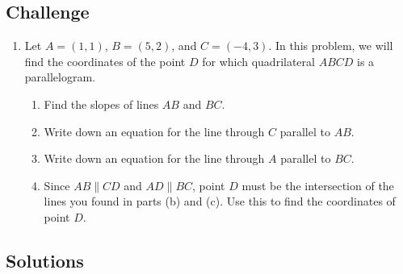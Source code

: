 \subsection{Challenge}

\begin{enumerate}[resume]
\item Let $A = (1,1)$, $B = (5,2)$, and $C = (-4,3)$. In this problem, we will find the coordinates of the point $D$ for which quadrilateral $ABCD$ is a parallelogram.
\begin{enumerate}
\item Find the slopes of lines $AB$ and $BC$.
\item Write down an equation for the line through $C$ parallel to $AB$.
\item Write down an equation for the line through $A$ parallel to $BC$.
\item Since $AB\parallel CD$ and $AD\parallel BC$, point $D$ must be the intersection of the lines you found in parts (b) and (c). Use this to find the coordinates of point $D$.
\end{enumerate}
\end{enumerate}

\newpage
\subsection{Solutions}